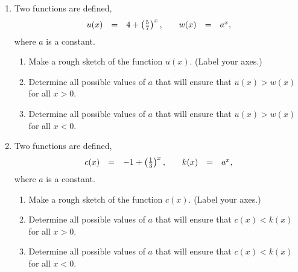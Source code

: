 \begin{enumerate}
\item Two functions are defined,
  \begin{equation*}
    \begin{array}{rcl@{\hspace{2em}}rcl}
      u(x) & = & 4 + \left(\frac{5}{7}\right)^x, & w(x) & = & a^x,
    \end{array}
  \end{equation*}
  where $a$ is a constant.
  \begin{enumerate}
  \item Make a rough sketch of the function $u(x)$. (Label your axes.)
  \item Determine all possible values of $a$ that will ensure that
    $u(x)>w(x)$ for all $x>0$.
  \item Determine all possible values of $a$ that will ensure that
    $u(x)>w(x)$ for all $x<0$.
  \end{enumerate}

\item Two functions are defined,
  \begin{equation*}
    \begin{array}{rcl@{\hspace{2em}}rcl}
      c(x) & = & -1 + \left(\frac{1}{3}\right)^x, & k(x) & = & a^x,
    \end{array}
  \end{equation*}
  where $a$ is a constant.
  \begin{enumerate}
  \item Make a rough sketch of the function $c(x)$. (Label your axes.)
  \item Determine all possible values of $a$ that will ensure that
    $c(x)<k(x)$ for all $x>0$.
  \item Determine all possible values of $a$ that will ensure that
    $c(x)<k(x)$ for all $x<0$.
  \end{enumerate}


\end{enumerate}
